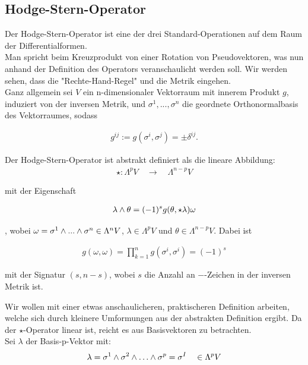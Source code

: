 \subsection{Hodge-Stern-Operator}
Der Hodge-Stern-Operator ist eine der drei Standard-Operationen auf dem Raum der Differentialformen. \\
Man spricht beim Kreuzprodukt von einer Rotation von Pseudovektoren, was nun anhand der Definition des Operators veranschaulicht werden soll. Wir werden sehen, dass die "Rechte-Hand-Regel" und die Metrik eingehen. \\
Ganz allgemein sei $V$ ein n-dimensionaler Vektorraum mit innerem Produkt $g$, induziert von der inversen Metrik, und ${\sigma^1, ..., \sigma^n}$ die geordnete Orthonormalbasis des Vektorraumes, sodass

\begin{align*}
g^{i j} := g(\sigma^{i},\sigma^{j}) = \pm \delta^{i j}.
\end{align*}


Der Hodge-Stern-Operator ist abstrakt definiert als die lineare Abbildung:
\begin{align*}
\star : \Lambda^p V \quad \rightarrow \quad  \Lambda^{n-p} V 
\end{align*}

mit der Eigenschaft

\begin{align}
\lambda \wedge \theta = (-1)^s g(\theta,\star\lambda) \omega
\end{align}

, wobei $\omega = \sigma^1 \wedge ... \wedge \sigma^n \in \Lambda^n V$, $\lambda \in \Lambda^p V$ und $\theta \in \Lambda^{n-p} V$. Dabei ist

 \begin{align}
 g(\omega,\omega) = \prod_{k=1}^{n} g(\sigma^{i},\sigma^{i}) = (-1)^s
 \end{align}
 
mit der Signatur $(s,n-s)$, wobei $s$ die Anzahl an $-$-Zeichen in der inversen Metrik ist.

 
Wir wollen mit einer etwas anschaulicheren, praktischeren Definition arbeiten, welche sich durch kleinere Umformungen aus der abstrakten Definition ergibt. Da der $\star$-Operator linear ist, reicht es aus Basisvektoren zu betrachten. \\

 Sei $\lambda$ der Basis-p-Vektor mit:
 \begin{align}
 \lambda = \sigma^1 \w \sigma^2 \w \dots \w \sigma^p = \sigma^{I} \quad \in \Lambda^p V
 \end{align}
 
